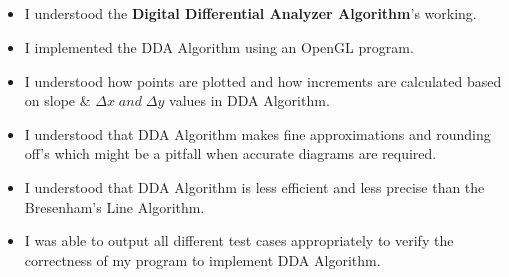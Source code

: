 \documentclass[12pt, a4]{article}
\begin{document}
\newpage
\subsection*{}
\begin{itemize}
\item I understood the \textbf{Digital Differential Analyzer Algorithm}'s working.
\item I implemented the DDA Algorithm using an OpenGL program.
\item I understood how points are plotted and how increments are calculated based on slope \& $\Delta x \; and \; \Delta y$ values in DDA Algorithm.
\item I understood that DDA Algorithm makes fine approximations and rounding off's which might be a pitfall when accurate diagrams are required.
\item I understood that DDA Algorithm is less efficient and less precise than the Bresenham's Line Algorithm.
\item I was able to output all different test cases appropriately to verify the correctness of my program to implement DDA Algorithm.

\end{itemize}
\end{document}
